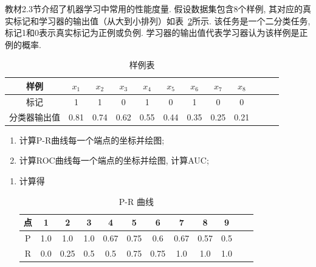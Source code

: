 \documentclass[answers]{exam}  %
\begin{document}
\begin{questions}
  教材2.3节介绍了机器学习中常用的性能度量. 假设数据集包含8个样例, 其对应的真实标记和学习器的输出值（从大到小排列）如表~\ref{table:roc}所示. 该任务是一个二分类任务, 标记1和0表示真实标记为正例或负例.
  学习器的输出值代表学习器认为该样例是正例的概率.
  \begin{table}[!h]
    \centering
    \caption{样例表} \vspace{2mm}\label{table:roc}
    \begin{tabular}{c|c c c c c c c c c c c}\toprule
      样例         & $x_1$ & $x_2$ & $x_3$ & $x_4$ & $x_5$ & $x_{6}$ & $x_{7}$ & $x_{8}$ \\
      \midrule
      标记         & 1     & 1     & 0     & 1     & 0     & 1       & 0       & 0       \\
      \midrule
      分类器输出值 & 0.81  & 0.74  & 0.62  & 0.55  & 0.44  & 0.35    & 0.25    & 0.21    \\
      \bottomrule
    \end{tabular}
  \end{table}
  \begin{enumerate}
    \item 计算P-R曲线每一个端点的坐标并绘图;
    \item 计算ROC曲线每一个端点的坐标并绘图, 计算AUC;
  \end{enumerate}
  \begin{solution}
    \begin{enumerate}
      \item 计算得

            \begin{table}[H]
              \centering
              \caption{P-R 曲线} \vspace{2mm}\label{table:roc}
              \begin{tabular}{c|c c c c c c c c c c c}\toprule
                点         & 1 & 2 & 3 & 4 & 5 & 6 & 7 & 8 & 9 \\
                \midrule
                P        &  1.0 &  1.0 &  1.0 &  0.67 &  0.75 &  0.6 &  0.67 &  0.57 &  0.5       \\
                \midrule
                R  &  0.0 &  0.25 &  0.5 &  0.5 &  0.75 &  0.75 &  1.0 &  1.0 &  1.0    \\
                \bottomrule
              \end{tabular}
            \end{table}


\end{enumerate}
\end{solution}
\end{questions}
\end{document}
